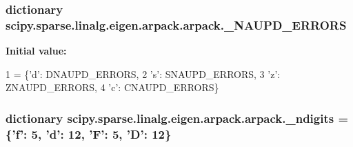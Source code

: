 \subsubsection[{\+\_\+\+N\+A\+U\+P\+D\+\_\+\+E\+R\+R\+O\+R\+S}]{\setlength{\rightskip}{0pt plus 5cm}dictionary scipy.\+sparse.\+linalg.\+eigen.\+arpack.\+arpack.\+\_\+\+N\+A\+U\+P\+D\+\_\+\+E\+R\+R\+O\+R\+S}\label{namespacescipy_1_1sparse_1_1linalg_1_1eigen_1_1arpack_1_1arpack_a5ac390e6e15c9df8e90b02f1e9e5dc35}
{\bfseries Initial value\+:}
\begin{DoxyCode}
1 = \{\textcolor{stringliteral}{'d'}: DNAUPD\_ERRORS,
2                  \textcolor{stringliteral}{'s'}: SNAUPD\_ERRORS,
3                  \textcolor{stringliteral}{'z'}: ZNAUPD\_ERRORS,
4                  \textcolor{stringliteral}{'c'}: CNAUPD\_ERRORS\}
\end{DoxyCode}
\hypertarget{namespacescipy_1_1sparse_1_1linalg_1_1eigen_1_1arpack_1_1arpack_a0faa7b6a83b8697f2c3cdac51de26233}{}
\subsubsection[{\+\_\+ndigits}]{\setlength{\rightskip}{0pt plus 5cm}dictionary scipy.\+sparse.\+linalg.\+eigen.\+arpack.\+arpack.\+\_\+ndigits = \{'f'\+: 5, 'd'\+: 12, 'F'\+: 5, '{\bf D}'\+: 12\}}\label{namespacescipy_1_1sparse_1_1linalg_1_1eigen_1_1arpack_1_1arpack_a0faa7b6a83b8697f2c3cdac51de26233}
\hypertarget{namespacescipy_1_1sparse_1_1linalg_1_1eigen_1_1arpack_1_1arpack_a4d1105b26a49e589a079ff1371df51d0}{}
